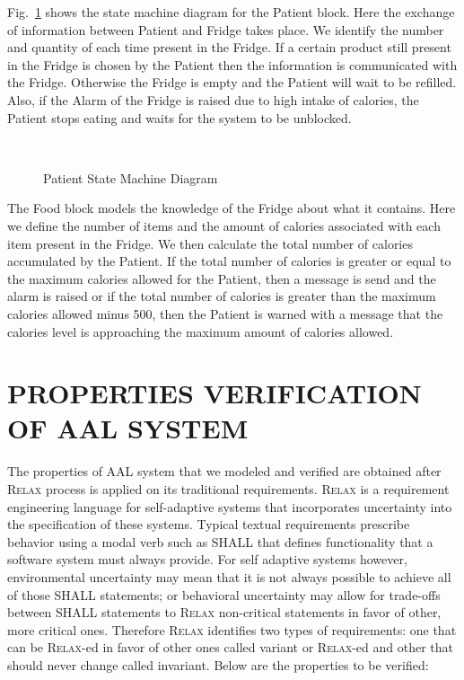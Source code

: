 \documentclass[a4paper,twoside]{article}
\def\myrelax{\textsc{Relax}}                  %
\begin{document}
Fig.~\ref{fig:patientstm} shows the state machine diagram for the Patient block. Here the exchange of information between Patient and Fridge takes place. We identify the number and quantity of each time present in the Fridge. If a certain product still present in the Fridge is chosen by the Patient then the information is  communicated with the Fridge.  Otherwise the Fridge is empty and the Patient will wait to be refilled. Also, if the Alarm of the Fridge is raised due to  high intake of calories, the Patient stops eating and waits for the system to be unblocked.
 
\begin{figure}[!h]
  \vspace{8cm}~
  \centering
  {}
  \caption{Patient State Machine Diagram}
  \label{fig:patientstm}
 \end{figure}
 

The Food block models the knowledge of the Fridge about what it contains. Here we define the number of items and the amount of calories associated with each item present in the Fridge. We then calculate the total number of calories accumulated by the Patient. If the total number of calories is greater or equal to the maximum calories allowed for the Patient, then a message is send and the alarm is raised or if the total number of calories is greater than the maximum calories allowed minus 500, then the Patient is warned with a message that the calories level is approaching the maximum amount of calories allowed.

\section{\uppercase{Properties Verification of AAL system}}
\label{properties verification}
The properties of AAL system that we modeled and verified are obtained after \myrelax{} process is applied on its traditional requirements. \myrelax{}  is  a  requirement  engineering language for self-adaptive systems that incorporates uncertainty into the specification of these systems. Typical  textual  requirements  prescribe behavior  using  a  modal  verb  such  as  SHALL  that defines  functionality  that  a  software  system  must always provide. For self adaptive systems however, environmental  uncertainty  may  mean  that  it  is  not always  possible  to  achieve  all  of  those  SHALL statements; or behavioral uncertainty may allow for trade-offs between SHALL statements to \myrelax{} non-critical  statements  in  favor  of  other,  more  critical ones.  Therefore  \myrelax{}  identifies  two  types  of requirements:  one  that  can  be  \myrelax{}-ed  in  favor  of other ones called variant or \myrelax{}-ed and other that should never change called invariant.
Below are the properties to be verified: 
\end{document}
